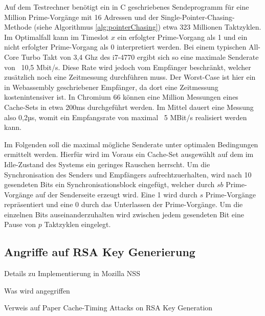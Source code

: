 Auf dem Testrechner benötigt ein in C geschriebenes Sendeprogramm für eine Million Prime-Vorgänge mit 16 Adressen und der Single-Pointer-Chasing-Methode (siehe Algorithmus \ref{alg:pointerChasing}) etwa 323 Millionen Taktzyklen.
Im Optimalfall kann im Timeslot $x$ ein erfolgter Prime-Vorgang als 1 und ein nicht erfolgter Prime-Vorgang als 0 interpretiert werden.
Bei einem typischen All-Core Turbo Takt von 3,4 Ghz des i7-4770 ergibt sich so eine maximale Senderate von ~10,5 Mbit/s.
Diese Rate wird jedoch vom Empfänger beschränkt, welcher zusätzlich noch eine Zeitmessung durchführen muss. Der Worst-Case ist hier ein in Webassembly geschriebener Empfänger, da dort eine Zeitmessung kostenintensiver ist. In Chromium 66 können
eine Million Messungen eines Cache-Sets in etwa 200ms durchgeführt werden. Im Mittel dauert eine Messung also 0,2µs, womit ein Empfangsrate von maximal ~5 MBit/s realisiert werden kann.

Im Folgenden soll die maximal mögliche Senderate unter optimalen Bedingungen ermittelt werden. Hierfür wird im Voraus ein Cache-Set ausgewählt auf dem im Idle-Zustand des Systems ein geringes Rauschen herrscht.
Um die Synchronisation des Senders und Empfängers aufrechtzuerhalten, wird nach 10 gesendeten Bits ein Synchronisationsblock eingefügt, welcher durch $sb$ Prime-Vorgänge auf der Senderseite erzeugt wird. 
Eine 1 wird durch $s$ Prime-Vorgänge repräsentiert und eine 0 durch das Unterlassen der Prime-Vorgänge. 
Um die einzelnen Bits auseinanderzuhalten wird zwischen jedem gesendeten Bit eine Pause von $p$ Taktzyklen eingelegt.






\subsection{Angriffe auf RSA Key Generierung}

Details zu Implementierung in Mozilla NSS

Was wird angegriffen

Verweis auf Paper Cache-Timing Attacks on RSA Key Generation